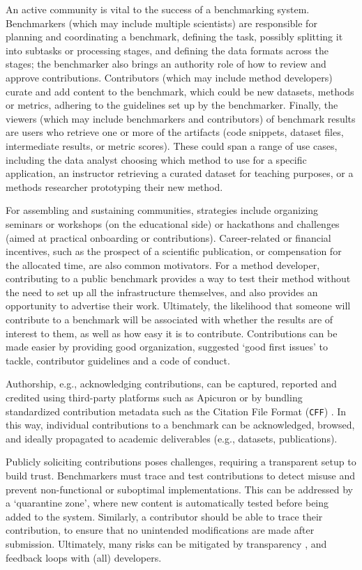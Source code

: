 \documentclass[11pt]{article}
\begin{document}
An active community is vital to the success of a benchmarking system. Benchmarkers (which may include multiple scientists) are responsible for planning and coordinating a benchmark, defining the task, possibly splitting it into subtasks or processing stages, and defining the data formats across the stages; the benchmarker also brings an authority role of how to review and approve contributions. Contributors (which may include method developers) curate and add content to the benchmark, which could be new datasets, methods or metrics, adhering to the guidelines set up by the benchmarker. Finally, the viewers (which may include benchmarkers and contributors) of benchmark results are users who retrieve one or more of the artifacts (code snippets, dataset files, intermediate results, or metric scores). These could span a range of use cases, including the data analyst choosing which method to use for a specific application, an instructor retrieving a curated dataset for teaching purposes, or a methods researcher prototyping their new method.

For assembling and sustaining communities, strategies include organizing seminars or workshops (on the educational side) or  hackathons and challenges (aimed at practical onboarding or contributions). Career-related or financial incentives, such as the prospect of a scientific publication, or compensation for the allocated time, are also common motivators. For a method developer, contributing to a public benchmark provides a way to test their method without the need to set up all the infrastructure themselves, and also provides an opportunity to advertise their work. Ultimately, the likelihood that someone will contribute to a benchmark will be associated with whether the results are of interest to them, as well as how easy it is to contribute. Contributions can be made easier by providing good organization, suggested `good first issues' to tackle, contributor guidelines and a code of conduct.

Authorship, e.g., acknowledging contributions, can be captured, reported and credited using third-party platforms such as Apicuron \cite{hatos2021apicuron} or by bundling standardized contribution metadata such as the Citation File Format (\texttt{CFF}) \cite{druskat_2021_5171937}. In this way, individual contributions to a benchmark can be acknowledged, browsed, and ideally propagated to academic deliverables (e.g., datasets, publications).

Publicly soliciting contributions poses challenges, requiring a transparent setup to build trust. Benchmarkers must trace and test contributions to detect misuse and prevent non-functional or suboptimal implementations. This can be addressed by a `quarantine zone', where new content is automatically tested before being added to the system. Similarly, a contributor should be able to trace their contribution, to ensure that no unintended modifications are made after submission. Ultimately, many risks can be mitigated by transparency \cite{Greenstein2016-os}, and feedback loops with (all) developers.
\end{document}

